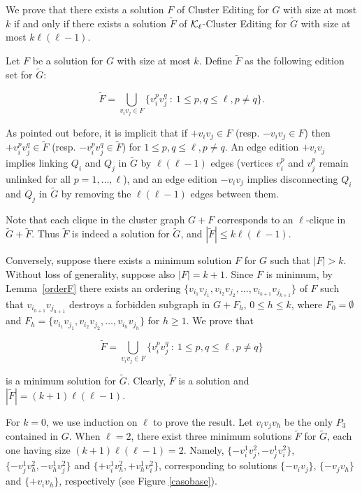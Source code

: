 \documentclass[12pt]{article}
\def\KL{{\cal K}_{\ell}}
\begin{document}
We prove that there exists a solution $F$ of {\sc Cluster Editing} for $G$ with size at most $k$
if and only if there exists a solution $\widetilde{F}$ of $\KL${\sc -Cluster Editing} for $\widetilde{G}$ with size at most $k\ell(\ell-1)$.

Let $F$ be a solution for $G$ with size at most $k$. Define $\widetilde{F}$ as the following edition set for $\widetilde{G}$:

\[\widetilde{F}= \bigcup_{v_iv_j \in F} \{v_i^p v_j^q \ : \ 1 \leq p,q \leq \ell, p \not= q\}.\]

As pointed out before, it is implicit that if $+ v_iv_j \in F$ (resp. $- v_iv_j \in F$) then $+ v_i^p v_j^q \in \widetilde{F}$ (resp. $- v_i^p v_j^q \in \widetilde{F}$) for $1 \leq p,q \leq \ell, p \not= q$. An edge edition $+ v_iv_j$ implies linking $Q_i$ and $Q_j$ in $\widetilde{G}$ by $\ell(\ell-1)$ edges (vertices $v_i^p$ and $v_j^p$ remain unlinked for all $p=1,\ldots,\ell$), and an edge edition $- v_iv_j$ implies disconnecting $Q_i$ and $Q_j$ in $\widetilde{G}$ by removing the $\ell(\ell-1)$ edges between them.

Note that each clique in the cluster graph $G+F$ corresponds to an $\ell$-clique in $\widetilde{G}+\widetilde{F}$. Thus $\widetilde{F}$ is indeed a solution for $\widetilde{G}$, and $|\widetilde{F}| \leq k\ell(\ell-1)$.

Conversely, suppose there exists a minimum solution $F$ for $G$ such that $|F|>k$. Without loss of generality, suppose also $|F|=k+1$. Since $F$ is minimum, by Lemma~\ref{orderF} there exists an ordering $\{v_{i_1}v_{j_1}, v_{i_2}v_{j_2}, \ldots, v_{i_{k+1}}v_{j_{k+1}}\}$ of $F$ such that $v_{i_{h+1}}v_{j_{h+1}}$ destroys a forbidden subgraph in $G + F_h$, $0 \leq h \leq k$, where $F_0=\emptyset$ and $F_h=\{v_{i_1}v_{j_1}, v_{i_2}v_{j_2}, \ldots, v_{i_h}v_{j_h}\}$ for $h\geq 1$. We prove that

\[\widetilde{F}= \bigcup_{v_iv_j \in F} \{v_i^p v_j^q \ : \ 1 \leq p,q \leq \ell, p \not= q\}\]

is a minimum solution for $\widetilde{G}$. Clearly, $\widetilde{F}$ is a solution and $|\widetilde{F}|= (k+1)\ell(\ell -1)$.

For $k=0$, we use induction on $\ell$ to prove the result. Let $v_iv_jv_h$ be the only $P_3$ contained in $G$. When $\ell=2$, there exist three minimum solutions $\widetilde{F}$ for $\widetilde{G}$, each one having size $(k+1)\ell(\ell-1)=2$. Namely, $\{-v_i^1 v_j^2, -v_j^1 v_i^2\}$,  $\{-v_j^1v_h^2, -v_h^1v_j^2\}$ and $\{+v_i^1v_h^2, +v_h^1v_i^2\}$, corresponding to solutions $\{-v_iv_j\}$, $\{-v_j v_h\}$ and $\{+v_i v_h\}$, respectively (see Figure \ref{casobase}).
\end{document}
